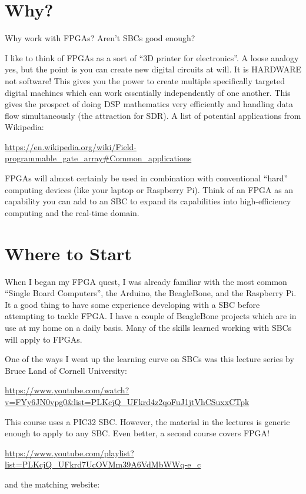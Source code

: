 \section{Why?}

Why work with FPGAs?  Aren't SBCs good enough?

I like to think of FPGAs as a sort of ``3D printer for electronics''.  A loose analogy yes, but the point is you can create new digital circuits at will.  It is HARDWARE not software!  This gives you the power to create multiple specifically targeted digital machines which can work essentially independently of one another.  This gives the prospect of doing DSP mathematics very efficiently and handling data flow simultaneously (the attraction for SDR).  A list of potential applications from Wikipedia:

\url{https://en.wikipedia.org/wiki/Field-programmable_gate_array#Common_applications}

FPGAs will almost certainly be used in combination with conventional ``hard'' computing devices (like your laptop or Raspberry Pi).  Think of an FPGA as an capability you can add to an SBC to expand its capabilities into high-efficiency computing and the real-time domain.

\section{Where to Start}

When I began my FPGA quest, I was already familiar with the most common ``Single Board Computers'', the Arduino, the BeagleBone, and the Raspberry Pi.
It a good thing to have some experience developing with a SBC before attempting to tackle FPGA.  I have a couple of BeagleBone
projects which are in use at my home on a daily basis.  Many of the skills learned working with SBCs will apply to FPGAs.

One of the ways I went up the learning curve on SBCs was this lecture series by Bruce Land of Cornell University:

\url{https://www.youtube.com/watch?v=FYy6JN0vpg0&list=PLKcjQ_UFkrd4z2qoFuJ1jtVhCSuxxCTpk}

This course uses a PIC32 SBC.  However, the material in the lectures is generic enough to apply to any SBC.
Even better, a second course covers FPGA!

\url{https://www.youtube.com/playlist?list=PLKcjQ_UFkrd7UcOVMm39A6VdMbWWq-e_c}

and the matching website:

